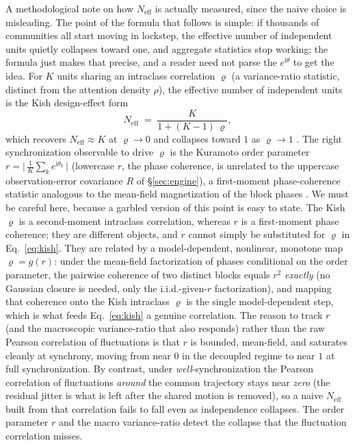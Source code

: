 \documentclass[11pt]{article}
\begin{document}
A methodological note on how $N_{\mathrm{eff}}$ is actually measured, since the naive choice is misleading. The point of the formula that follows is simple: if thousands of communities all start moving in lockstep, the effective number of independent units quietly collapses toward one, and aggregate statistics stop working; the formula just makes that precise, and a reader need not parse the $e^{\mathrm{i}\theta}$ to get the idea. For $K$ units sharing an intraclass correlation $\varrho$ (a variance-ratio statistic, distinct from the attention density $\rho$), the effective number of independent units is the Kish design-effect form
\begin{equation}
N_{\mathrm{eff}} \;=\; \frac{K}{1 + (K-1)\,\varrho},
\label{eq:kish}
\end{equation}
which recovers $N_{\mathrm{eff}}\approx K$ at $\varrho\to 0$ and collapses toward $1$ as $\varrho\to 1$ \cite{kish1965}. The right synchronization observable to drive $\varrho$ is the Kuramoto order parameter $r = \big|\,\frac{1}{K}\sum_k e^{\mathrm{i}\theta_k}\,\big|$ (lowercase $r$, the phase coherence, is unrelated to the uppercase observation-error covariance $R$ of \S\ref{sec:engine}), a first-moment phase-coherence statistic analogous to the mean-field magnetization of the block phases \cite{strogatz2000}. We must be careful here, because a garbled version of this point is easy to state. The Kish $\varrho$ is a second-moment intraclass correlation, whereas $r$ is a first-moment phase coherence; they are different objects, and $r$ cannot simply be substituted for $\varrho$ in Eq.~\eqref{eq:kish}. They are related by a model-dependent, nonlinear, monotone map $\varrho = g(r)$: under the mean-field factorization of phases conditional on the order parameter, the pairwise coherence of two distinct blocks equals $r^2$ \emph{exactly} (no Gaussian closure is needed, only the i.i.d.-given-$r$ factorization), and mapping that coherence onto the Kish intraclass $\varrho$ is the single model-dependent step, which is what feeds Eq.~\eqref{eq:kish} a genuine correlation. The reason to track $r$ (and the macroscopic variance-ratio that also responds) rather than the raw Pearson correlation of fluctuations is that $r$ is bounded, mean-field, and saturates cleanly at synchrony, moving from near $0$ in the decoupled regime to near $1$ at full synchronization. By contrast, under \emph{well}-synchronization the Pearson correlation of fluctuations \emph{around} the common trajectory stays near \emph{zero} (the residual jitter is what is left after the shared motion is removed), so a naive $N_{\mathrm{eff}}$ built from that correlation fails to fall even as independence collapses. The order parameter $r$ and the macro variance-ratio detect the collapse that the fluctuation correlation misses.
\end{document}
